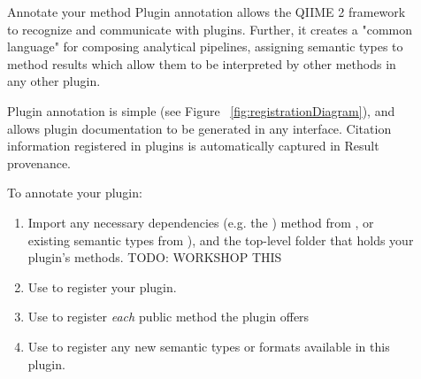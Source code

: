 \documentclass[final]{beamer}
\newlength{\sepwidth}
\newlength{\colwidth}
\newcommand{\separatorcolumn}{\begin{column}{\sepwidth}\end{column}}
\begin{document}
\begin{frame}[t]
\begin{columns}[t]
\begin{column}{\colwidth}
\end{column}

\separatorcolumn

\begin{column}{\colwidth}

\begin{block}{Annotate your method}
  Plugin annotation allows the QIIME 2 framework to recognize and communicate with plugins.
  Further, it creates a "common language" for composing analytical pipelines,
  assigning semantic types to method results which allow them to be interpreted by other
  methods in any other plugin.

  Plugin annotation is simple (see Figure ~\ref{fig:registrationDiagram}), and allows plugin documentation
  to be generated in any interface. Citation information registered in plugins
  is automatically captured in Result provenance.

  To annotate your plugin:

  \begin{enumerate}
    \item Import any necessary dependencies (e.g. the ) method from ,
    or existing semantic types from ), and the top-level folder that holds your plugin's methods. TODO: WORKSHOP THIS
    \item Use  to register your plugin.
    \item Use  to register \textit{each} public method the plugin offers
    \item Use  to register any new semantic types or formats available in this plugin.
  \end{enumerate}

\end{block}


\end{column}
\end{columns}
\end{frame}
\end{document}
